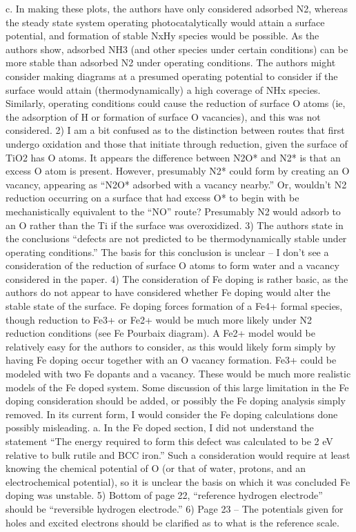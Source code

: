 c.      In making these plots, the authors have only considered adsorbed N2, whereas the steady state system operating photocatalytically would attain a surface potential, and formation of stable NxHy species would be possible.  As the authors show, adsorbed NH3 (and other species under certain conditions) can be more stable than adsorbed N2 under operating conditions.  The authors might consider making diagrams at a presumed operating potential to consider if the surface would attain (thermodynamically) a high coverage of NHx species.  Similarly, operating conditions could cause the reduction of surface O atoms (ie, the adsorption of H or formation of surface O vacancies), and this was not considered.
2)       I am a bit confused as to the distinction between routes that first undergo oxidation and those that initiate through reduction, given the surface of TiO2 has O atoms.  It appears the difference between N2O* and N2* is that an excess O atom is present.  However, presumably N2* could form by creating an O vacancy, appearing as “N2O* adsorbed with a vacancy nearby.”  Or, wouldn’t N2 reduction occurring on a surface that had excess O* to begin with be mechanistically equivalent to the “NO” route?  Presumably N2 would adsorb to an O rather than the Ti if the surface was overoxidized.
3)      The authors state in the conclusions “defects are not predicted to be thermodynamically stable under operating conditions.”  The basis for this conclusion is unclear – I don’t see a consideration of the reduction of surface O atoms to form water and a vacancy considered in the paper.
4)      The consideration of Fe doping is rather basic, as the authors do not appear to have considered whether Fe doping would alter the stable state of the surface.  Fe doping forces formation of a Fe4+ formal species, though reduction to Fe3+ or Fe2+ would be much more likely under N2 reduction conditions (see Fe Pourbaix diagram).  A Fe2+ model would be relatively easy for the authors to consider, as this would likely form simply by having Fe doping occur together with an O vacancy formation.   Fe3+ could be modeled with two Fe dopants and a vacancy.  These would be much more realistic models of the Fe doped system.  Some discussion of this large limitation in the Fe doping consideration should be added, or possibly the Fe doping analysis simply removed.  In its current form, I would consider the Fe doping calculations done possibly misleading.
a.      In the Fe doped section, I did not understand the statement “The energy required to form this defect was calculated to be 2 eV relative to bulk rutile and BCC iron.”  Such a consideration would require at least knowing the chemical potential of O (or that of water, protons, and an electrochemical potential), so it is unclear the basis on which it was concluded Fe doping was unstable.
5)       Bottom of page 22, “reference hydrogen electrode” should be “reversible hydrogen electrode.”
6)      Page 23 – The potentials given for holes and excited electrons should be clarified as to what is the reference scale.